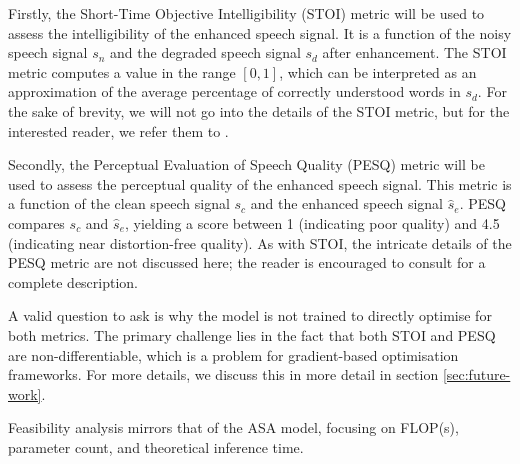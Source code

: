\documentclass[logo,bsc,singlespacing,parskip,online]{infthesis}
\begin{document}
Firstly, the Short-Time Objective Intelligibility (STOI) \citep{taal_algorithm_2011} metric will be used to assess the intelligibility of the enhanced speech signal.
It is a function of the noisy speech signal $s_n$ and the degraded speech signal $s_d$ after enhancement.
The STOI metric computes a value in the range \([0, 1]\), which can be interpreted as an approximation of the average percentage of correctly understood words in $s_d$. 
For the sake of brevity, we will not go into the details of the STOI metric, but for the interested reader, we refer them to \citet{taal_algorithm_2011}.

Secondly, the Perceptual Evaluation of Speech Quality (PESQ) \citep{rix_perceptual_2001} metric will be 
used to assess the perceptual quality of the enhanced speech signal. 
This metric is a function of the clean speech signal $s_c$ and the enhanced speech signal $\hat{s}_e$.
PESQ compares $s_c$ and $\hat{s}_e$, yielding a score between 1 (indicating poor quality) and 4.5 (indicating near distortion-free quality). 
As with STOI, the intricate details of the PESQ metric are not discussed here; the reader is encouraged to consult \citet{rix_perceptual_2001} for a complete description.

A valid question to ask is why the model is not trained to directly optimise for both metrics. The primary challenge lies in the fact that both STOI and PESQ are non-differentiable,
which is a problem for gradient-based optimisation frameworks. 
For more details, we discuss this in more detail in section \ref{sec:future-work}.

Feasibility analysis mirrors that of the ASA model, focusing on FLOP(s), parameter count, and theoretical inference time.
\end{document}
